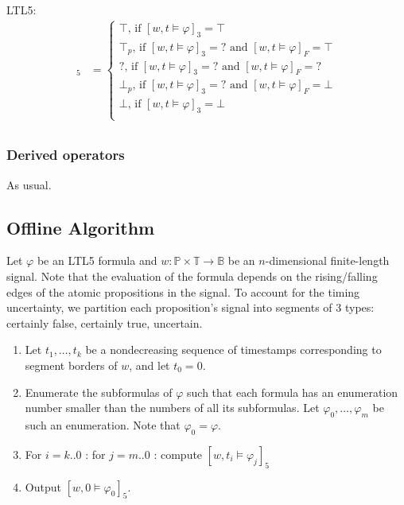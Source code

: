 \documentclass[envcountsame, runningheads]{llncs}
\newcommand{\B}{\mathbb{B}}
\newcommand{\?}{\text{?}}
\begin{document}
	LTL5:
	\begin{align*}
		[w,t \models \varphi]_5 &= \begin{cases}
			\top \text{, if } [w,t \models \varphi]_3 = \top \\
			\top_p \text{, if } [w,t \models \varphi]_3 = ? \text{ and } [w,t \models \varphi]_F = \top \\
			? \text{, if } [w,t \models \varphi]_3 = ? \text{ and } [w,t \models \varphi]_F = ? \\
			\bot_p \text{, if } [w,t \models \varphi]_3 = ? \text{ and } [w,t \models \varphi]_F = \bot \\
			\bot \text{, if } [w,t \models \varphi]_3 = \bot \\
		\end{cases} \\
	\end{align*}
	
	\subsubsection{Derived operators}
	As usual.
	

	\subsection*{Offline Algorithm}
	Let $\varphi$ be an LTL5 formula and $w : \mathbb{P} \times \mathbb{T} \to \B$ be an $n$-dimensional finite-length signal.
	Note that the evaluation of the formula depends on the rising/falling edges of the atomic propositions in the signal.
	To account for the timing uncertainty, we partition each proposition's signal into segments of 3 types: certainly false, certainly true, uncertain.
	
	\begin{enumerate}
		\item Let $t_1, \ldots, t_k$ be a nondecreasing sequence of timestamps corresponding to segment borders of $w$, and let $t_0 = 0$.
		\item Enumerate the subformulas of $\varphi$ such that each formula has an enumeration number smaller than the numbers of all its subformulas. Let $\varphi_0, \ldots, \varphi_m$ be such an enumeration. Note that $\varphi_0 = \varphi$.
		\item For $i = k .. 0$ : for $j = m .. 0$ : compute $[w, t_i \models \varphi_j]_5$
		\item Output $[w,0 \models \varphi_0]_5$.
	\end{enumerate}
\end{document}
